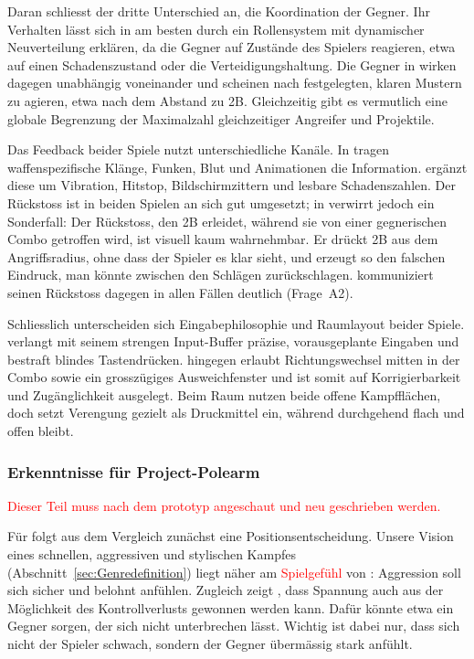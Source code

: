 \documentclass[../Main.tex]{subfiles}
\begin{document}
Daran schliesst der dritte Unterschied an, die Koordination der Gegner. Ihr Verhalten lässt sich in  am besten durch ein Rollensystem mit dynamischer Neuverteilung erklären, da die Gegner auf Zustände des Spielers reagieren, etwa auf einen Schadenszustand oder die Verteidigungshaltung. Die Gegner in  wirken dagegen unabhängig voneinander und scheinen nach festgelegten, klaren Mustern zu agieren, etwa nach dem Abstand zu 2B. Gleichzeitig gibt es vermutlich eine globale Begrenzung der Maximalzahl gleichzeitiger Angreifer und Projektile.

Das Feedback beider Spiele nutzt unterschiedliche Kanäle. In  tragen waffenspezifische Klänge, Funken, Blut und Animationen die Information.  ergänzt diese um Vibration, Hitstop, Bildschirmzittern und lesbare Schadenszahlen. Der Rückstoss ist in beiden Spielen an sich gut umgesetzt; in  verwirrt jedoch ein Sonderfall: Der Rückstoss, den 2B erleidet, während sie von einer gegnerischen Combo getroffen wird, ist visuell kaum wahrnehmbar. Er drückt 2B aus dem Angriffsradius, ohne dass der Spieler es klar sieht, und erzeugt so den falschen Eindruck, man könnte zwischen den Schlägen zurückschlagen.  kommuniziert seinen Rückstoss dagegen in allen Fällen deutlich (Frage~A2).

Schliesslich unterscheiden sich Eingabephilosophie und Raumlayout beider Spiele.  verlangt mit seinem strengen Input-Buffer präzise, vorausgeplante Eingaben und bestraft blindes Tastendrücken.  hingegen erlaubt Richtungswechsel mitten in der Combo sowie ein grosszügiges Ausweichfenster und ist somit auf Korrigierbarkeit und Zugänglichkeit ausgelegt. Beim Raum nutzen beide offene Kampfflächen, doch  setzt Verengung gezielt als Druckmittel ein, während  durchgehend flach und offen bleibt.

\subsubsection{Erkenntnisse für Project-Polearm}

\textcolor{red}{Dieser Teil muss nach dem prototyp angeschaut und neu geschrieben werden.}

Für  folgt aus dem Vergleich zunächst eine Positionsentscheidung. Unsere Vision eines schnellen, aggressiven und stylischen Kampfes (Abschnitt~\ref{sec:Genredefinition}) liegt näher am \textcolor{red}{Spielgefühl} von : Aggression soll sich sicher und belohnt anfühlen. Zugleich zeigt , dass Spannung auch aus der Möglichkeit des Kontrollverlusts gewonnen werden kann. Dafür könnte etwa ein Gegner sorgen, der sich nicht unterbrechen lässt. Wichtig ist dabei nur, dass sich nicht der Spieler schwach, sondern der Gegner übermässig stark anfühlt.
\end{document}
